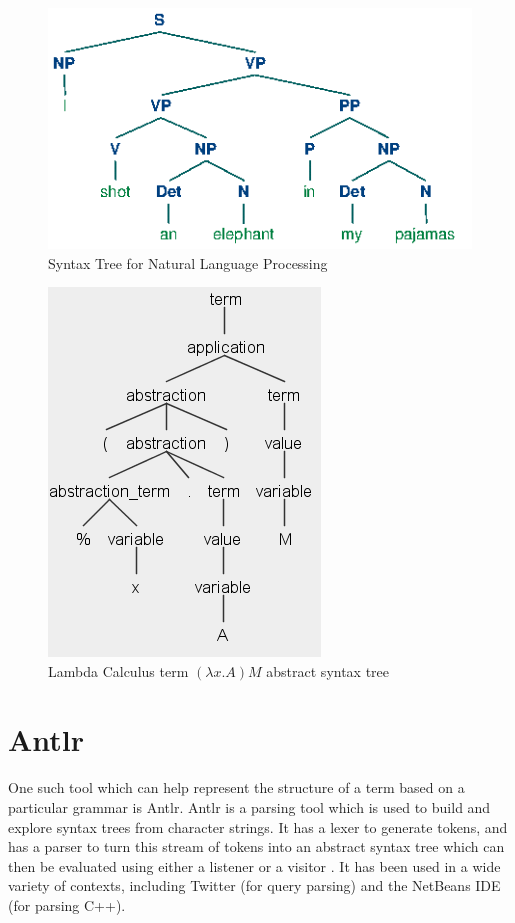 \documentclass[a4paper,12pt]{report}
\begin{document}
\begin{figure}[p]
	\centering
	\includegraphics[scale=0.75]{images/nlp_tree}
	\caption{Syntax Tree for Natural Language Processing \protect\cite{Bird2009}}
	\label{nlp_tree}
\end{figure}

\begin{figure}[p]
	\centering
	\includegraphics[scale=0.75]{images/abstract_syntax_tree}
	\caption{Lambda Calculus term $(\lambda x.A)M$ abstract syntax tree}
	\label{abstract_syntax_tree}
\end{figure}


\section{Antlr}

One such tool which can help represent the structure of a term based on a particular grammar is Antlr. Antlr is a parsing tool which is used to build and explore syntax trees from character strings. It has a lexer to generate tokens, and has a parser to turn this stream of tokens into an abstract syntax tree which can then be evaluated using either a listener or a visitor \cite{Parr2012}. It has been used in a wide variety of contexts, including Twitter (for query parsing) and the NetBeans IDE (for parsing C++). %
\end{document}
